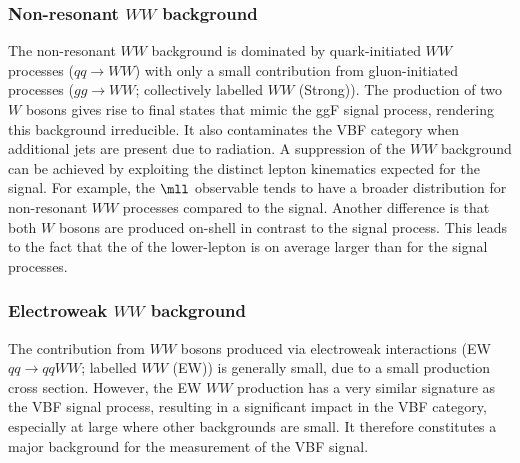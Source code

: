 \subsubsection{Non-resonant $WW$ background}
The non-resonant $WW$ background is dominated by quark-initiated $WW$ processes ($qq \to WW$) with only a small contribution from gluon-initiated processes ($gg \to WW$; collectively labelled $WW$ (Strong)).
The production of two $W$ bosons gives rise to final states that mimic the ggF signal process, rendering this background irreducible. 
It also contaminates the VBF \TwoJet category when additional jets are present due to radiation. 
A suppression of the $WW$ background can be achieved by exploiting the distinct lepton kinematics expected for the signal. For example, the $\mll$ observable tends to have a broader distribution for non-resonant $WW$ processes compared to the signal. 
Another difference is that both $W$ bosons are produced on-shell in contrast to the signal process. 
This leads to the fact that the \pT of the lower-\pT lepton is on average larger than for the signal processes. 

\subsubsection{Electroweak $WW$ background}
The contribution from $WW$ bosons produced via electroweak interactions (EW $qq \to qqWW$; labelled $WW$ (EW)) is generally small, due to a small production cross section. However, the EW $WW$ production has a very similar signature as the VBF signal process, resulting in a significant impact in the VBF category, especially at large \mjj where other backgrounds are small. 
It therefore constitutes a major background for the measurement of the VBF signal. 

